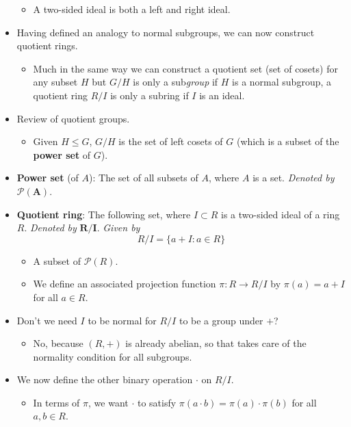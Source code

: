 \documentclass[../notes.tex]{subfiles}
\begin{document}
\begin{itemize}
\begin{itemize}
        \item A two-sided ideal is both a left and right ideal.
    \end{itemize}
    \item Having defined an analogy to normal subgroups, we can now construct quotient rings.
    \begin{itemize}
        \item Much in the same way we can construct a quotient set (set of cosets) for any subset $H$ but $G/H$ is only a sub\emph{group} if $H$ is a normal subgroup, a quotient ring $R/I$ is only a subring if $I$ is an ideal.
    \end{itemize}
    \item Review of quotient groups.
    \begin{itemize}
        \item Given $H\leq G$, $G/H$ is the set of left cosets of $G$ (which is a subset of the \textbf{power set} of $G$).
    \end{itemize}
    \item \textbf{Power set} (of $A$): The set of all subsets of $A$, where $A$ is a set. \emph{Denoted by} $\bm{\mathcal{P}(A)}$.
    \item \textbf{Quotient ring}: The following set, where $I\subset R$ is a two-sided ideal of a ring $R$. \emph{Denoted by} $\bm{R/I}$. \emph{Given by}
    \begin{equation*}
        R/I = \{a+I:a\in R\}
    \end{equation*}
    \begin{itemize}
        \item A subset of $\mathcal{P}(R)$.
        \item We define an associated projection function $\pi:R\to R/I$ by $\pi(a)=a+I$ for all $a\in R$.
    \end{itemize}
    \item Don't we need $I$ to be normal for $R/I$ to be a group under $+$?
    \begin{itemize}
        \item No, because $(R,+)$ is already abelian, so that takes care of the normality condition for all subgroups.
    \end{itemize}
    \item We now define the other binary operation $\cdot$ on $R/I$.
    \begin{itemize}
        \item In terms of $\pi$, we want $\cdot$ to satisfy $\pi(a\cdot b)=\pi(a)\cdot\pi(b)$ for all $a,b\in R$.

\end{itemize}
\end{itemize}
\end{document}
